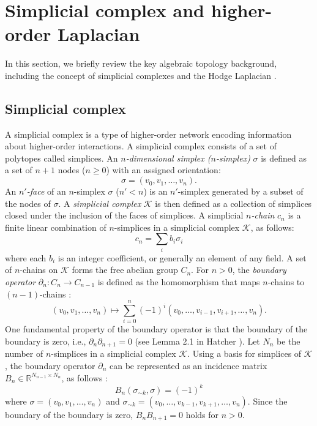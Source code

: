 \documentclass[10pt, letterpaper]{article}
\begin{document}
\section{Simplicial complex and higher-order Laplacian} \label{secbackground}
In this section, we briefly review the key algebraic topology background, including the concept of simplicial complexes \cite{Hatcher2002, Jonsson2008} and the Hodge Laplacian \cite{Lim2020}.

\subsection{Simplicial complex}
A simplicial complex is a type of higher-order network encoding information about higher-order interactions. A simplicial complex consists of a set of polytopes called simplices. An \textit{$n$-dimensional simplex ($n$-simplex)} $\sigma$ is defined as a set of $n+1$ nodes ($n\geq 0$) with an assigned orientation:
\begin{equation}
\sigma=(v_0, v_1, \ldots, v_n).
\end{equation}
An \textit{$n'$-face} of an $n$-simplex $\sigma$ ($n' < n$) is an $n'$-simplex generated by a subset of the nodes of $\sigma$. A \textit{simplicial complex} $\mathcal{K}$ is then defined as a collection of simplices closed under the inclusion of the faces of simplices. A simplicial \textit{$n$-chain} $c_n$ is a finite linear combination of $n$-simplices in a simplicial complex $\mathcal{K}$, as follows:
\begin{equation}
c_n=\sum_{i}{b_{i}\sigma_{i}}
\end{equation}
where each $b_i$ is an integer coefficient, or generally an element of any field. A set of $n$-chains on $\mathcal{K}$ forms the free abelian group $C_n$. For $n>0$, the \textit{boundary operator} $\partial_{n}: C_{n}\to C_{n-1}$ is defined as the homomorphism that maps $n$-chains to $(n-1)$-chains \cite{Hatcher2002, Jonsson2008}:
\begin{equation}
(v_0, v_1, \ldots, v_n) \mapsto \sum_{i=0}^{n}{(-1)^{i}(v_0,\ldots,v_{i-1},v_{i+1},\ldots,v_n)}.
\end{equation}
One fundamental property of the boundary operator is that the boundary of the boundary is zero, i.e., $\partial_{n}\partial_{n+1}=0$ (see Lemma 2.1 in Hatcher \cite{Hatcher2002}). Let $N_n$ be the number of $n$-simplices in a simplicial complex $\mathcal{K}$. Using a basis for simplices of $\mathcal{K}$, the boundary operator $\partial_n$ can be represented as an incidence matrix $B_n\in\mathbb{R}^{N_{n-1}\times N_{n}}$, as follows \cite{Baccini2022}:
\begin{equation}
B_n(\sigma_{\sim k}, \sigma)=(-1)^k
\end{equation}
where $\sigma=(v_0,v_1,\ldots,v_n)$ and $\sigma_{\sim k}=(v_0,\ldots,v_{k-1},v_{k+1},\ldots,v_n)$. Since the boundary of the boundary is zero, $B_{n}B_{n+1}=0$ holds for $n>0$.
\end{document}
